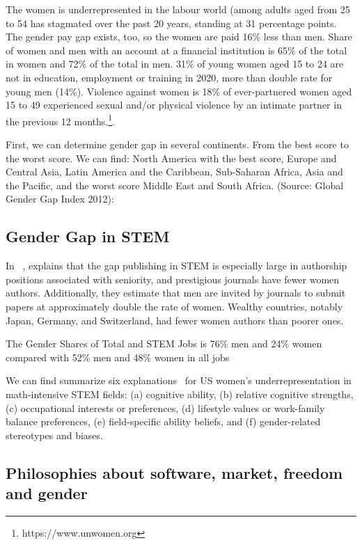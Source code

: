 \documentclass[fleqn,10pt,lineno]{wlpeerj} %
\begin{document}
The women is underrepresented in the labour world (among adults aged
from 25 to 54 has stagmated over the past 20 years, standing at 31
percentage points. The gender pay gap exists, too, so the women are
paid 16\% less than men. Share of women and men with an account at a
financial institution is 65\% of the total in women and 72\% of the
total in men. 31\% of young women aged 15 to 24 are not in education,
employment or training in 2020, more than double rate for young men
(14\%). Violence against women is 18\% of ever-partnered women aged 15
to 49 experienced sexual and/or physical violence by an intimate
partner in the previous 12 months.\footnote{https://www.unwomen.org}.

First, we can determine gender gap in several continents. From the
best score to the worst score. We can find: North America with the
best score, Europe and Central Asia, Latin America and the Caribbean,
Sub-Saharan Africa, Asia and the Pacific, and the worst score Middle
East and South Africa.  (Source: Global Gender Gap Index 2012):


\subsection*{Gender Gap in STEM}

In ~\cite{holman2018gender}, explains that the gap publishing in STEM
is especially large in authorship positions associated with seniority,
and prestigious journals have fewer women authors. Additionally, they
estimate that men are invited by journals to submit papers at
approximately double the rate of women. Wealthy countries, notably
Japan, Germany, and Switzerland, had fewer women authors than poorer
ones.

The Gender Shares of Total and STEM Jobs is 76\% men and 24\% women compared with
52\% men and 48\% women in all jobs ~\cite{beede2011women}

We can find summarize six explanations~\cite{wang2017gender} for US
women’s underrepresentation in math-intensive STEM fields: (a)
cognitive ability, (b) relative cognitive strengths, (c) occupational
interests or preferences, (d) lifestyle values or work-family balance
preferences, (e) field-specific ability beliefs, and (f)
gender-related stereotypes and biases.

\subsection*{Philosophies about software, market, freedom and gender}
\end{document}
